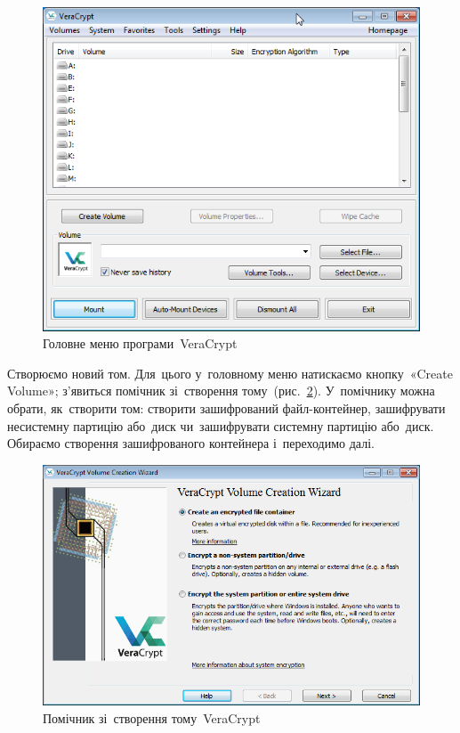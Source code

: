 \documentclass[
	a4paper,
	oneside,
	BCOR = 10mm,
	DIV = 12,
	12pt,
	headings = normal,
]{scrartcl}
\begin{document}
		\begin{figure}[!htbp]
			\centering
			\includegraphics[height = 10 \baselineskip]{./assets/01.png}
			\caption{Головне меню програми~\textenglish{VeraCrypt}}
			\label{fig:vc-main-menu}
		\end{figure}

		Створюємо новий том. Для~цього у~головному меню натискаємо кнопку~«\textenglish{Create Volume}»; з'явиться помічник зі~створення тому~(рис.~\ref{fig:vc-volcr-wizard}). У~помічнику можна обрати, як~створити том: створити зашифрований файл-контейнер, зашифрувати несистемну партицію або~диск чи~зашифрувати системну партицію або~диск. Обираємо створення зашифрованого контейнера і~переходимо далі.

		\begin{figure}[!htbp]
			\centering
			\includegraphics[height = 10 \baselineskip]{./assets/02.png}
			\caption{Помічник зі~створення тому~\textenglish{VeraCrypt}}
			\label{fig:vc-volcr-wizard}
		\end{figure}
\end{document}
